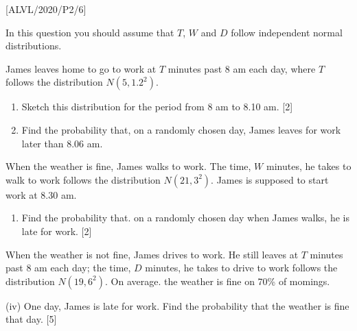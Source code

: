 \item {[}ALVL/2020/P2/6{]}

In this question you should assume that $T$, $W$ and $D$ follow
independent normal distributions. 

James leaves home to go to work at $T$ minutes past 8 am each day,
where $T$ follows the distribution $N\left(5,1.2^{2}\right)$. 
\begin{enumerate}
\item Sketch this distribution for the period from 8 am to 8.10 am.\hfill{}
{[}2{]} 
\item Find the probability that, on a randomly chosen day, James leaves
for work later than 8.06 am. 
\end{enumerate}
When the weather is fine, James walks to work. The time, $W$ minutes,
he takes to walk to work follows the distribution $N(21,3^{2})$.
James is supposed to start work at 8.30 am. 
\begin{enumerate}
\item Find the probability that. on a randomly chosen day when James walks,
he is late for work. \hfill{}{[}2{]}
\end{enumerate}
When the weather is not fine, James drives to work. He still leaves
at $T$ minutes past 8 am each day; the time, $D$ minutes, he takes
to drive to work follows the distribution $N(19,6^{2})$. On average.
the weather is fine on 70\% of momings. 

(iv) One day, James is late for work. Find the probability that the
weather is fine that day. \hfill{}{[}5{]}
